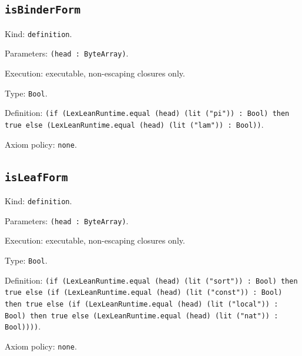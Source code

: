 \documentclass[11pt]{article}
\begin{document}
\subsection*{\texttt{isBinderForm}}
\noindent Kind: \texttt{definition}.\par
\noindent Parameters: \texttt{(head : ByteArray)}.\par
\noindent Execution: executable, non-escaping closures only.\par
\noindent Type: \texttt{Bool}.\par
\noindent Definition: \texttt{(if (LexLeanRuntime.equal (head) (lit ("pi")) : Bool) then true else (LexLeanRuntime.equal (head) (lit ("lam")) : Bool))}.\par
\noindent Axiom policy: \texttt{none}.\par
\subsection*{\texttt{isLeafForm}}
\noindent Kind: \texttt{definition}.\par
\noindent Parameters: \texttt{(head : ByteArray)}.\par
\noindent Execution: executable, non-escaping closures only.\par
\noindent Type: \texttt{Bool}.\par
\noindent Definition: \texttt{(if (LexLeanRuntime.equal (head) (lit ("sort")) : Bool) then true else (if (LexLeanRuntime.equal (head) (lit ("const")) : Bool) then true else (if (LexLeanRuntime.equal (head) (lit ("local")) : Bool) then true else (LexLeanRuntime.equal (head) (lit ("nat")) : Bool))))}.\par
\noindent Axiom policy: \texttt{none}.\par
\end{document}
